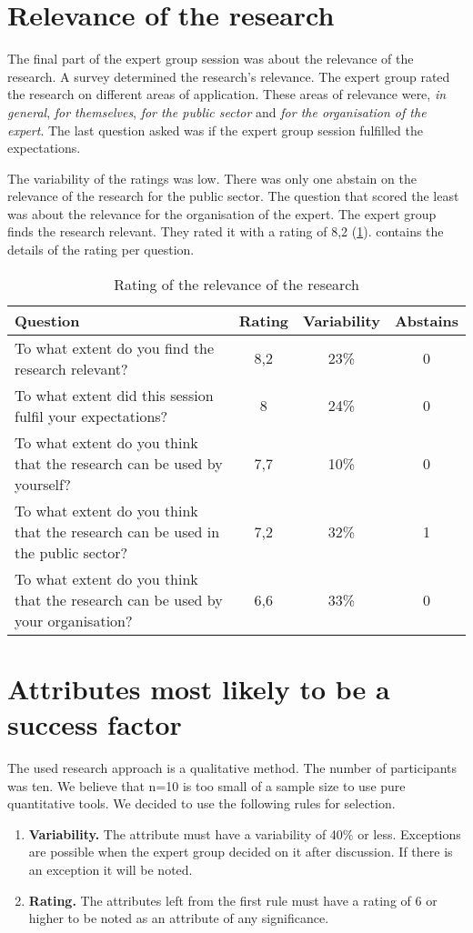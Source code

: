 \section{Relevance of the research}
\label{sec:relevanceofresearch}
The final part of the expert group session was about the relevance of the research. A survey determined the research's relevance. The expert group rated the research on different areas of application. These areas of relevance were, \textit{in general}, \textit{for themselves}, \textit{for the public sector} and \textit{for the organisation of the expert}. The last question asked was if the expert group session fulfilled the expectations.

The variability of the ratings was low. There was only one abstain on the relevance of the research for the public sector. The question that scored the least was about the relevance for the organisation of the expert. The expert group finds the research relevant. They rated it with a rating of 8,2 (\cref{tab:relevanceofresearch}).  contains the details of the rating per question.
\begin{table}[H]
	\centering
	\begin{tabular}{p{}ccc}
		\toprule
		\textbf{Question} & \textbf{Rating} & \textbf{Variability} & \textbf{Abstains} \\
		\midrule
		To what extent do you find the research relevant? & 8,2 & 23\% & 0 \\%
		To what extent did this session fulfil your expectations? & 8 & 24\% & 0 \\%
		To what extent do you think that the research can be used by yourself? & 7,7 & 10\% & 0 \\%
		To what extent do you think that the research can be used in the public sector? & 7,2 & 32\% & 1 \\%
		To what extent do you think that the research can be used by your organisation? & 6,6 & 33\% & 0 \\%
		\bottomrule
	\end{tabular}%
	\caption[Rating of the relevance of the research]{Rating of the relevance of the research}
	\label{tab:relevanceofresearch}%
\end{table}%
\section{Attributes most likely to be a success factor}
\label{sec:expertattributessf}
The used research approach is a qualitative method. The number of participants was ten. We believe that n=10 is too small of a sample size to use pure quantitative tools. We decided to use the following rules for selection. 
\begin{enumerate}
	\item{\textbf{Variability.} The attribute must have a variability of 40\% or less. Exceptions are possible when the expert group decided on it after discussion. If there is an exception it will be noted.}
	\item{\textbf{Rating.} The attributes left from the first rule must have a rating of 6 or higher to be noted as an attribute of any significance.}
\end{enumerate}

